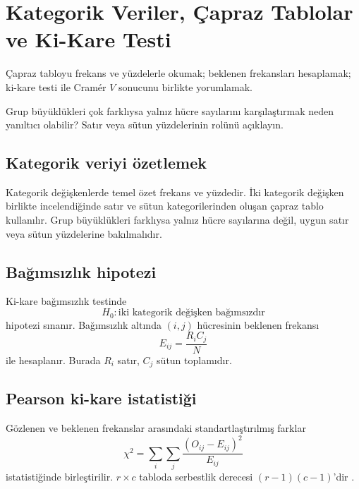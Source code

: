 \chapter{Kategorik Veriler, Çapraz Tablolar ve Ki-Kare Testi}

\begin{hedefler}
Çapraz tabloyu frekans ve yüzdelerle okumak; beklenen frekansları hesaplamak;
ki-kare testi ile Cramér $V$ sonucunu birlikte yorumlamak.
\end{hedefler}

\begin{hazirlik}
Grup büyüklükleri çok farklıysa yalnız hücre sayılarını karşılaştırmak neden
yanıltıcı olabilir? Satır veya sütun yüzdelerinin rolünü açıklayın.
\end{hazirlik}

\section{Kategorik veriyi özetlemek}

Kategorik değişkenlerde temel özet frekans ve yüzdedir. İki kategorik
değişken birlikte incelendiğinde satır ve sütun kategorilerinden oluşan çapraz
tablo kullanılır. Grup büyüklükleri farklıysa yalnız hücre sayılarına değil,
uygun satır veya sütun yüzdelerine bakılmalıdır.

\section{Bağımsızlık hipotezi}

Ki-kare bağımsızlık testinde
\[
H_0:\text{iki kategorik değişken bağımsızdır}
\]
hipotezi sınanır. Bağımsızlık altında $(i,j)$ hücresinin beklenen frekansı
\[
E_{ij}=\frac{R_iC_j}{N}
\]
ile hesaplanır. Burada $R_i$ satır, $C_j$ sütun toplamıdır.

\section{Pearson ki-kare istatistiği}

Gözlenen ve beklenen frekanslar arasındaki standartlaştırılmış farklar
\[
\chi^2=\sum_i\sum_j\frac{(O_{ij}-E_{ij})^2}{E_{ij}}
\]
istatistiğinde birleştirilir. $r\times c$ tabloda serbestlik derecesi
$(r-1)(c-1)$'dir \cite{degroot2012,conover1999}.

